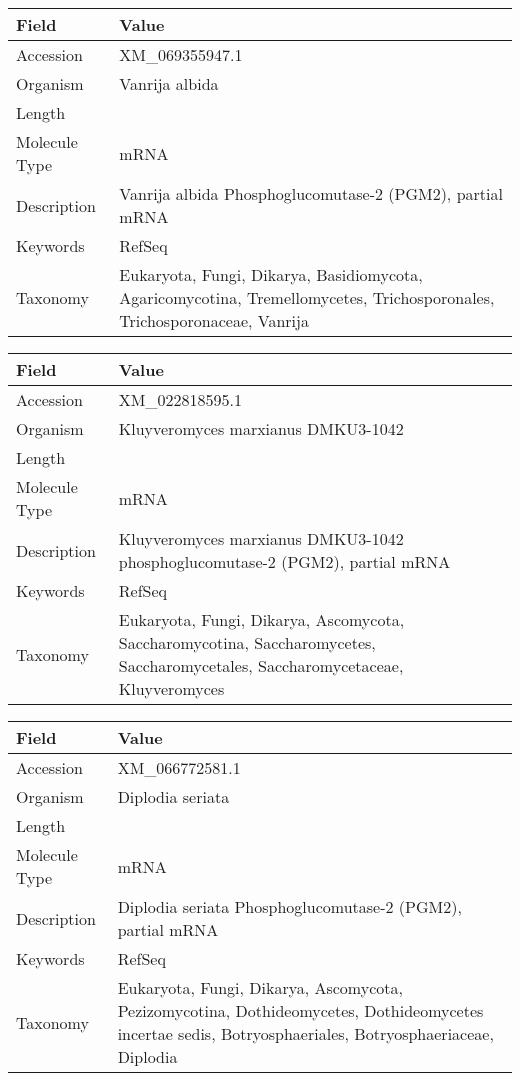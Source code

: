 \documentclass[10pt]{article}
\begin{document}
\vspace{1em}
{\footnotesize
\begin{longtable}{>{\raggedright\arraybackslash}p{4.5cm} >{\raggedright\arraybackslash}p{11.5cm}}
\textbf{Field} & \textbf{Value} \\
\hline
Accession & XM\_069355947.1 \\
Organism & Vanrija albida \\
Length & 1713 \\
Molecule Type & mRNA \\
Description & Vanrija albida Phosphoglucomutase-2 (PGM2), partial mRNA \\
Keywords & RefSeq \\
Taxonomy & Eukaryota, Fungi, Dikarya, Basidiomycota, Agaricomycotina, Tremellomycetes, Trichosporonales, Trichosporonaceae, Vanrija \\
\end{longtable}
}

\vspace{1em}
{\footnotesize
\begin{longtable}{>{\raggedright\arraybackslash}p{4.5cm} >{\raggedright\arraybackslash}p{11.5cm}}
\textbf{Field} & \textbf{Value} \\
\hline
Accession & XM\_022818595.1 \\
Organism & Kluyveromyces marxianus DMKU3-1042 \\
Length & 1701 \\
Molecule Type & mRNA \\
Description & Kluyveromyces marxianus DMKU3-1042 phosphoglucomutase-2 (PGM2), partial mRNA \\
Keywords & RefSeq \\
Taxonomy & Eukaryota, Fungi, Dikarya, Ascomycota, Saccharomycotina, Saccharomycetes, Saccharomycetales, Saccharomycetaceae, Kluyveromyces \\
\end{longtable}
}

\vspace{1em}
{\footnotesize
\begin{longtable}{>{\raggedright\arraybackslash}p{4.5cm} >{\raggedright\arraybackslash}p{11.5cm}}
\textbf{Field} & \textbf{Value} \\
\hline
Accession & XM\_066772581.1 \\
Organism & Diplodia seriata \\
Length & 1719 \\
Molecule Type & mRNA \\
Description & Diplodia seriata Phosphoglucomutase-2 (PGM2), partial mRNA \\
Keywords & RefSeq \\
Taxonomy & Eukaryota, Fungi, Dikarya, Ascomycota, Pezizomycotina, Dothideomycetes, Dothideomycetes incertae sedis, Botryosphaeriales, Botryosphaeriaceae, Diplodia \\
\end{longtable}
}
\end{document}
